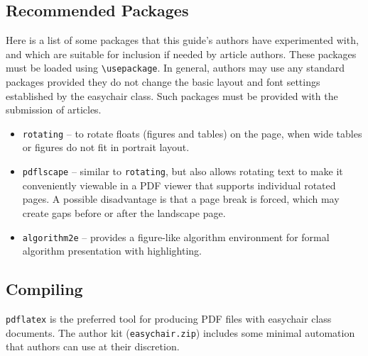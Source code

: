 \documentclass[withtimes]{easychair}
\newcommand{\easychair}{\textsf{easychair}}
\begin{document}
\subsection{Recommended Packages}
\label{sect:recommended-packages}

Here is a list of some packages that this guide's authors have experimented 
with, and which are suitable for inclusion if needed by article authors.
These packages must be loaded using \verb+\usepackage+.
In general, authors may use any standard packages provided they do not change
the basic layout and font settings established by the {\easychair} class.
Such packages must be provided with the submission of articles.

\begin{itemize}
\item
\texttt{rotating} \cite{rotating-package} -- to rotate floats (figures and
tables) on the page, when wide tables or figures do not fit in portrait layout.

\item
\texttt{pdflscape} \cite{pdflscape-package} -- similar to \texttt{rotating}, 
but also allows rotating text to make it conveniently viewable in a PDF 
viewer that supports individual rotated pages.
A possible disadvantage is that a page break is forced, which may create
gaps before or after the landscape page.

\item
\texttt{algorithm2e} \cite{algorithm2e-package} -- provides a figure-like
algorithm environment for formal algorithm presentation with highlighting.

\end{itemize}

\subsection{Compiling}
\label{sect:compiling}

\texttt{pdflatex} \cite{pdflatex-instructions} is the preferred tool for
producing PDF files with {\easychair} class documents.
The author kit (\texttt{easychair.zip}) includes some minimal automation 
that authors can use at their discretion.
\end{document}
